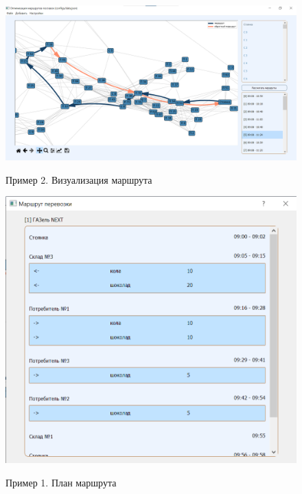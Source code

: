 \begin{figure}[h!]
	\begin{center}
		{\includegraphics[scale=0.45, angle=0, page=1]{img/demo_routes_2.png}}
		\caption{Пример 2. Визуализация маршрута}
		\label{demo:routes2}
	\end{center}
\end{figure}

\begin{figure}[h!]
	\begin{center}
		{\includegraphics[scale=0.6, angle=0, page=1]{img/demo_route_1.png}}
		\caption{Пример 1. План маршрута}
		\label{demo:route1}
	\end{center}
\end{figure}

